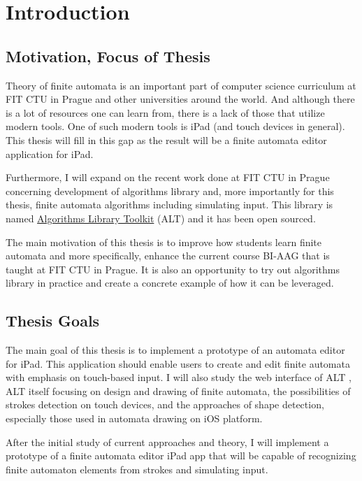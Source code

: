 \chapter{Introduction}
\setcounter{page}{1}

\section{Motivation, Focus of Thesis}

Theory of finite automata is an important part of computer science curriculum at FIT CTU in Prague and other universities around the world. And although there is a lot of resources one can learn from, there is a lack of those that utilize modern tools. One of such modern tools is iPad (and touch devices in general). This thesis will fill in this gap as the result will be a finite automata editor application for iPad.

Furthermore, I will expand on the recent work done at FIT CTU in Prague concerning development of algorithms library and, more importantly for this thesis, finite automata algorithms including simulating input. This library is named \href{https://alt.fit.cvut.cz/}{Algorithms Library Toolkit} (ALT) \cite{alt} and it has been open sourced.

The main motivation of this thesis is to improve how students learn finite automata and more specifically, enhance the current course BI-AAG that is taught at FIT CTU in Prague. It is also an opportunity to try out algorithms library in practice and create a concrete example of how it can be leveraged.

\section{Thesis Goals}

The main goal of this thesis is to implement a prototype of an automata editor for iPad. This application should enable users to create and edit finite automata with emphasis on touch-based input.
I will also study the web interface of ALT \cite{state-maker} \cite{web-alt}, ALT itself focusing on design and drawing of finite automata, the possibilities of strokes detection on touch devices, and the approaches of shape detection, especially those used in automata drawing on iOS platform.

After the initial study of current approaches and theory, I will implement a prototype of a finite automata editor iPad app that will be capable of recognizing finite automaton elements from strokes and simulating input.

